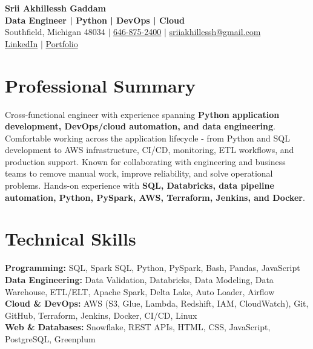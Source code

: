 \documentclass[letterpaper,10pt]{article}
\begin{document}
\fontsize{9.35pt}{10.45pt}\selectfont

\begin{center}
    {\LARGE \textbf{Srii Akhillessh Gaddam}} \\[-1pt]
    \textbf{Data Engineer | Python | DevOps | Cloud} \\[2pt]
    Southfield, Michigan 48034 $|$
    \href{tel:6468752400}{646-875-2400} $|$
    \href{mailto:sriiakhillessh@gmail.com}{sriiakhillessh@gmail.com} \\[1pt]
    \href{https://www.linkedin.com/in/srii-akhiilessh-gaddam-b48668191/}{LinkedIn} $|$
    \href{https://sriiakhillesshg.github.io/portfolio/}{Portfolio}
\end{center}
\vspace{-8pt}

\section{Professional Summary}
\small{Cross-functional engineer with experience spanning \textbf{Python application development, DevOps/cloud automation, and data engineering}. Comfortable working across the application lifecycle - from Python and SQL development to AWS infrastructure, CI/CD, monitoring, ETL workflows, and production support. Known for collaborating with engineering and business teams to remove manual work, improve reliability, and solve operational problems. Hands-on experience with \textbf{SQL, Databricks, data pipeline automation, Python, PySpark, AWS, Terraform, Jenkins, and Docker}.}

\section{Technical Skills}
\small{
\textbf{Programming:} SQL, Spark SQL, Python, PySpark, Bash, Pandas, JavaScript \\
\textbf{Data Engineering:} Data Validation, Databricks, Data Modeling, Data Warehouse, ETL/ELT, Apache Spark, Delta Lake, Auto Loader, Airflow \\
\textbf{Cloud \& DevOps:} AWS (S3, Glue, Lambda, Redshift, IAM, CloudWatch), Git, GitHub, Terraform, Jenkins, Docker, CI/CD, Linux \\
\textbf{Web \& Databases:} Snowflake, REST APIs, HTML, CSS, JavaScript, PostgreSQL, Greenplum
}
\end{document}
